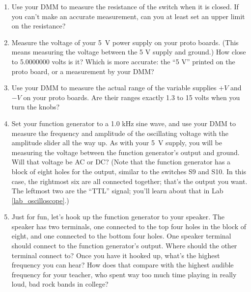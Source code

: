 \begin{enumerate}
\item Use your DMM to measure the resistance of the switch when it is closed.  If you can't make an accurate measurement, can you at least set an upper limit on the resistance? 

\item Measure the voltage of your 5~V power supply on your proto boards.  (This means measuring the voltage between the 5 V supply and ground.)  How close to 5.0000000 volts is it?  Which is more accurate: the ``5 V'' printed on the proto board, or a measurement by your DMM?

\item Use your DMM to measure the actual range of the variable supplies $+V$ and $-V$ on your proto boards.  Are their ranges exactly 1.3 to 15 volts when you turn the knobs?

\item Set your function generator to a 1.0 kHz sine wave, and use your DMM to measure the frequency and amplitude of the oscillating voltage with the amplitude slider all the way up.   As with your 5~V supply, you will be measuring the voltage between the function generator's output and ground.  Will that voltage be AC or DC?  (Note that the function generator has a block of eight holes for the output, similar to the switches S9 and S10.  In this case, the rightmost six are all connected together; that's the output you want.  The leftmost two are the ``TTL'' signal; you'll learn about that in Lab \ref{lab_oscilloscope}.)

\item Just for fun, let's hook up the function generator to your speaker.  The speaker has two terminals, one connected to the top four holes in the block of eight, and one connected to the bottom four holes.  One speaker terminal should connect to the function generator's output.  Where should the other terminal connect to?  Once you have it hooked up, what's the highest frequency you can hear?  How does that compare with the highest audible frequency for your teacher, who spent way too much time playing in really loud, bad rock bands in college?
 
\end{enumerate}




